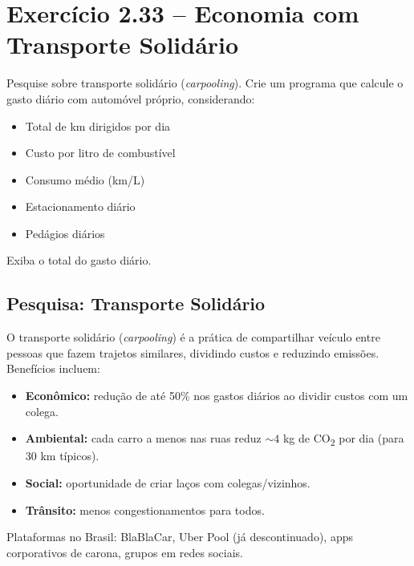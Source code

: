 \documentclass[12pt,a4paper]{article}
\begin{document}
\newpage

\section{Exercício 2.33 -- Economia com Transporte Solidário}

\begin{enunciadoBox}[Enunciado 2.33]
Pesquise sobre transporte solidário (\textit{carpooling}). Crie um programa que
calcule o gasto diário com automóvel próprio, considerando:
\begin{itemize}[noitemsep]
  \item Total de km dirigidos por dia
  \item Custo por litro de combustível
  \item Consumo médio (km/L)
  \item Estacionamento diário
  \item Pedágios diários
\end{itemize}
Exiba o total do gasto diário.
\end{enunciadoBox}

\subsection*{Pesquisa: Transporte Solidário}

\begin{pesquisa}
O transporte solidário (\textit{carpooling}) é a prática de compartilhar veículo
entre pessoas que fazem trajetos similares, dividindo custos e reduzindo emissões.
Benefícios incluem:

\begin{itemize}[noitemsep]
  \item \textbf{Econômico:} redução de até 50\% nos gastos diários ao dividir
  custos com um colega.
  \item \textbf{Ambiental:} cada carro a menos nas ruas reduz $\sim 4$ kg de
  CO\textsubscript{2} por dia (para 30 km típicos).
  \item \textbf{Social:} oportunidade de criar laços com colegas/vizinhos.
  \item \textbf{Trânsito:} menos congestionamentos para todos.
\end{itemize}

Plataformas no Brasil: BlaBlaCar, Uber Pool (já descontinuado), apps corporativos
de carona, grupos em redes sociais.
\end{pesquisa}
\end{document}
